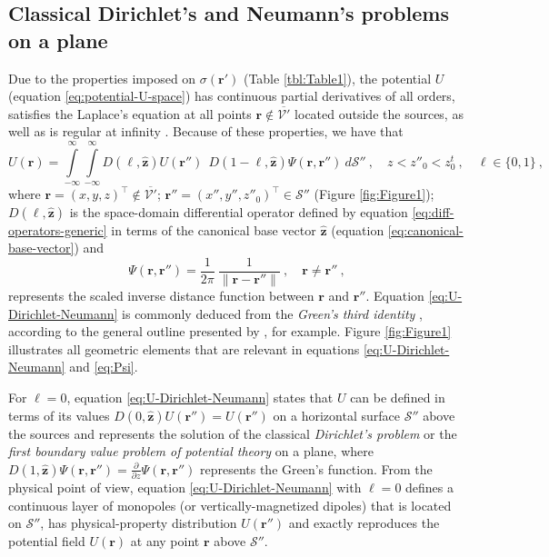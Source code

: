 \subsection{Classical Dirichlet's and Neumann's problems on a plane}
\label{subsec:dirichlet_neumann}

Due to the properties imposed on $\sigma(\mathbf{r}')$ (Table \ref{tbl:Table1}), the potential 
$U$ (equation \ref{eq:potential-U-space}) has continuous partial derivatives of all orders, 
satisfies the Laplace's equation at all points $\mathbf{r} \notin \overline{\mathcal{V}'}$ 
located outside the sources, as well as is regular at infinity \citep[][ p. 122--124, 217]{kellogg1967}.
Because of these properties, we have that
\begin{equation}
	U(\mathbf{r}) = 
	\int\limits_{-\infty}^{\infty} \int\limits_{-\infty}^{\infty}
	D(\ell, \hat{\mathbf{z}}) U(\mathbf{r}'') \:\: 
	D(1 - \ell, \hat{\mathbf{z}}) \Psi(\mathbf{r}, \mathbf{r}'')
	\: d\mathcal{S}'' \: , \quad  z < z''_{0} < z^{t}_{0} \: ,
	\quad \ell \in \{0, 1\} \: ,
	\label{eq:U-Dirichlet-Neumann}
\end{equation}
where $\mathbf{r} = (x, y, z)^{\top} \notin \overline{\mathcal{V}'}$; 
$\mathbf{r}'' = (x'', y'', z''_{0})^{\top} \in \mathcal{S}''$ (Figure \ref{fig:Figure1}); 
$D(\ell, \hat{\mathbf{z}})$ is the space-domain differential operator 
defined by equation \ref{eq:diff-operators-generic} in terms of the canonical base vector 
$\hat{\mathbf{z}}$ (equation \ref{eq:canonical-base-vector}) and 
\begin{equation}
	\Psi(\mathbf{r}, \mathbf{r}'') = 
	\frac{1}{2\pi} \: 
	\frac{1}{\| \mathbf{r} - \mathbf{r}'' \|} \: , 
	\quad \mathbf{r} \ne \mathbf{r}'' \: ,
	\label{eq:Psi}
\end{equation}
represents the scaled inverse distance function between $\mathbf{r}$ and $\mathbf{r}''$. 
Equation \ref{eq:U-Dirichlet-Neumann} is commonly deduced from 
the \textit{Green's third identity} \citep[][ p. 219]{kellogg1967}, according to
the general outline presented by \cite{roy1962}, for example.
Figure \ref{fig:Figure1} illustrates all geometric elements that are relevant in equations  
\ref{eq:U-Dirichlet-Neumann} and \ref{eq:Psi}.

For $\ell = 0$, equation \ref{eq:U-Dirichlet-Neumann} states that $U$ can be defined
in terms of its values $D(0, \hat{\mathbf{z}}) U(\mathbf{r}'') = U(\mathbf{r}'')$ on a horizontal surface $\mathcal{S}''$ 
above the sources and represents the solution of the classical \textit{Dirichlet’s problem} or the 
\textit{first boundary value problem of potential theory} \cite[][ p. 236]{kellogg1967} on a plane, where 
$D(1, \hat{\mathbf{z}}) \Psi(\mathbf{r}, \mathbf{r}'') = \tfrac{\partial}{\partial z} \Psi(\mathbf{r}, \mathbf{r}'')$ 
represents the Green's function.
From the physical point of view, equation \ref{eq:U-Dirichlet-Neumann} with $\ell = 0$ defines a continuous 
layer of monopoles (or vertically-magnetized dipoles) that is located on $\mathcal{S}''$, has 
physical-property distribution $U(\mathbf{r}'')$ and exactly reproduces the 
potential field $U(\mathbf{r})$ at any point $\mathbf{r}$ above $\mathcal{S}''$.

